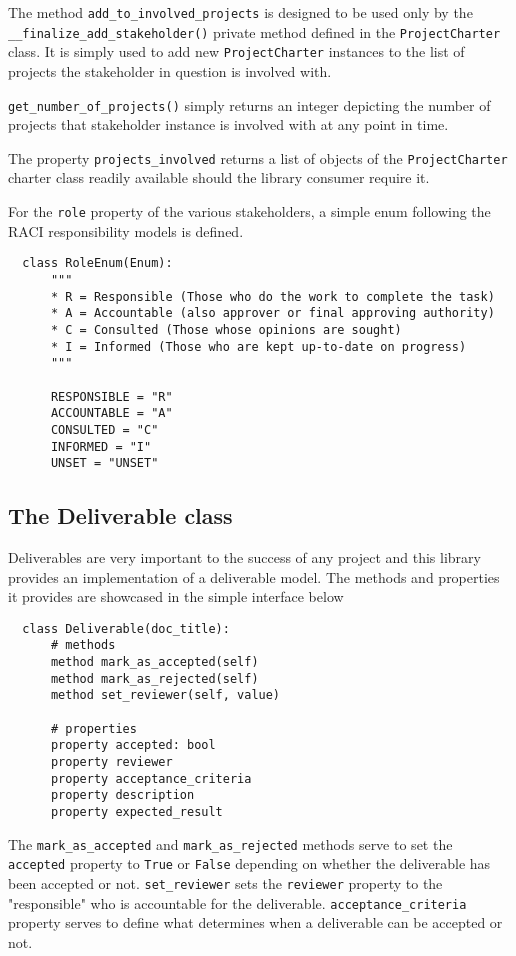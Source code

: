The method \verb+add_to_involved_projects+ is designed to be used only by the \linebreak \verb+__finalize_add_stakeholder()+ private method defined in the \verb+ProjectCharter+ class. It is simply used to add new \verb+ProjectCharter+ instances to the list of projects the stakeholder in question is involved with.

\verb+get_number_of_projects()+ simply returns an integer depicting the number of projects that stakeholder instance is involved with at any point in time.

The property \verb+projects_involved+ returns a list of objects of the \verb+ProjectCharter+ charter class readily available should the library consumer require it.

For the \verb+role+ property of the various stakeholders, a simple enum following the RACI responsibility models is defined.

\begin{lstlisting}
  class RoleEnum(Enum):
      """
      * R = Responsible (Those who do the work to complete the task)
      * A = Accountable (also approver or final approving authority)
      * C = Consulted (Those whose opinions are sought)
      * I = Informed (Those who are kept up-to-date on progress)
      """

      RESPONSIBLE = "R"
      ACCOUNTABLE = "A"
      CONSULTED = "C"
      INFORMED = "I"
      UNSET = "UNSET"
\end{lstlisting}


\subsection{The Deliverable class}
Deliverables are very important to the success of any project and this library provides an implementation of a deliverable model. The methods and properties it provides are showcased in the simple interface below

\begin{lstlisting}
  class Deliverable(doc_title):
      # methods
      method mark_as_accepted(self)
      method mark_as_rejected(self)
      method set_reviewer(self, value)

      # properties
      property accepted: bool
      property reviewer
      property acceptance_criteria
      property description
      property expected_result
\end{lstlisting}

The \verb+mark_as_accepted+ and \verb+mark_as_rejected+ methods serve to set the \verb+accepted+ property to \verb+True+ or \verb+False+ depending on whether the deliverable has been accepted or not. \verb+set_reviewer+ sets the \verb+reviewer+ property to the "responsible" who is accountable for the deliverable. \verb+acceptance_criteria+ property serves to define what determines when a deliverable can be accepted or not.


